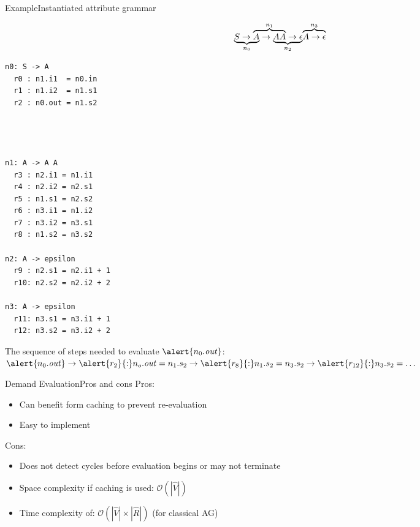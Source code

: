 \begin{frame}[fragile=singleslide]{Example}{Instantiated attribute grammar}

\[
\lefteqn{\underbrace{\phantom{S \rightarrow A}}_{n_0}} S \rightarrow
\lefteqn{\overbrace{\phantom{A \rightarrow A A}}^{n_1}} A \rightarrow 
\lefteqn{\underbrace{\phantom{A A \rightarrow \epsilon}}_{n_2}} A A \rightarrow \epsilon
\lefteqn{\overbrace{A \rightarrow \epsilon}^{n_3}}
\]


\begin{multicols}{3}
\begin{Verbatim}[fontsize=\scriptsize]
n0: S -> A
  r0 : n1.i1  = n0.in
  r1 : n1.i2  = n1.s1
  r2 : n0.out = n1.s2




n1: A -> A A
  r3 : n2.i1 = n1.i1
  r4 : n2.i2 = n2.s1
  r5 : n1.s1 = n2.s2
  r6 : n3.i1 = n1.i2
  r7 : n3.i2 = n3.s1
  r8 : n1.s2 = n3.s2

n2: A -> epsilon
  r9 : n2.s1 = n2.i1 + 1
  r10: n2.s2 = n2.i2 + 2
    
n3: A -> epsilon
  r11: n3.s1 = n3.i1 + 1
  r12: n3.s2 = n3.i2 + 2
\end{Verbatim}
\end{multicols}

The sequence of steps needed to evaluate $\alert{n_0.\mathit{out}}$:
$\alert{n_0.\mathit{out}} \to \alert{r_2}{:} n_o.\mathit{out} = n_1.s_2 \to \alert{r_8}{:} n_1.s_2 = n_3.s_2 \to \alert{r_{12}}{:}n_3.s_2 = \dots$

\end{frame}


\begin{frame}{Demand Evaluation}{Pros and cons}
Pros:
\begin{itemize}
    \item Can benefit form \alert{caching to prevent re-evaluation}
    \item Easy to implement
\end{itemize}

Cons:
\begin{itemize}
    \item Does not detect cycles before evaluation begins or \alert{may not terminate}
    \item Space complexity if \alert{caching} is used: $\mathcal{O}(|\hat{V}|)$
    \item Time complexity of: $\mathcal{O}(| \hat{V} | \times | \hat{R} |)$ (for classical AG)
\end{itemize}
\end{frame}


